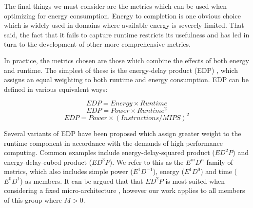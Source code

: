 The final things we must consider are the metrics which can be used when optimizing for energy consumption. Energy to completion is one obvious choice which is widely used in domains where available energy is severely limited. That said, the fact that it fails to capture runtime restricts its usefulness and has led in turn to the development of other more comprehensive metrics.

In practice, the metrics chosen are those which  combine the effects of both energy and runtime. The simplest of these is the energy-delay product (EDP) \cite{gonzales:1995aa}, which assigns an equal weighting to both runtime and energy consumption. EDP can be defined in various equivalent ways:\golden

\begin{equation}
EDP = Energy \times Runtime
\end{equation}
\begin{equation}
\label{eq:edp}
EDP = Power \times Runtime^{2}
\end{equation}
\begin{equation}
EDP = Power \times (Instructions / MIPS)^{2}
\end{equation}

Several variants of EDP have been proposed which assign greater weight to the runtime component in accordance with the demands of high performance computing. Common examples include energy-delay-squared product ($ED^{2}P$) and energy-delay-cubed product ($ED^{3}P$). We refer to this as the $E^mD^n$ family of metrics, which also includes simple power ($E^1D^{-1}$), energy ($E^1D^0$) and time ($E^0D^1$) as members. It can be argued that that $ED^{2}P$ is most suited when considering a fixed micro-architecture \cite{brooks:2000aa}, however our work applies to all members of this group where $M > 0$.